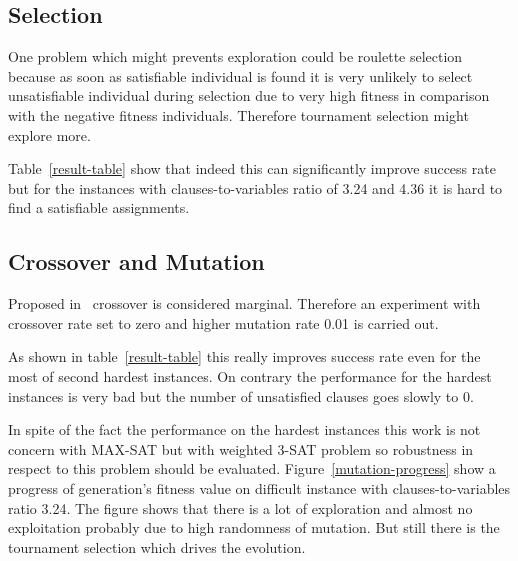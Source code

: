 \documentclass{article}
\begin{document}
\subsection{Selection}

One problem which might prevents exploration could be roulette selection
because as soon as satisfiable individual is found
it is very unlikely to select unsatisfiable individual during selection
due to very high fitness in comparison with the negative fitness individuals.
Therefore tournament selection might explore more.

Table~\ref{result-table} show that indeed this can significantly improve
success rate but for the instances with clauses-to-variables ratio of 3.24
and 4.36 it is hard to find a satisfiable assignments.

\subsection{Crossover and Mutation}

Proposed in~\cite{park1995} crossover is considered marginal.
Therefore an experiment with crossover rate set to zero
and higher mutation rate 0.01 is carried out.

As shown in table~\ref{result-table} this really improves success rate even
for the most of second hardest instances.
On contrary the performance for the hardest instances is very bad but the
number of unsatisfied clauses goes slowly to 0.

In spite of the fact the performance on the hardest instances
this work is not concern with MAX-SAT but with weighted 3-SAT problem
so robustness in respect to this problem should be evaluated.
Figure~\ref{mutation-progress} show a progress of generation's fitness value
on difficult instance with clauses-to-variables ratio 3.24.
The figure shows that there is a lot of exploration
and almost no exploitation probably due to high randomness of mutation.
But still there is the tournament selection which drives the evolution.
\end{document}
